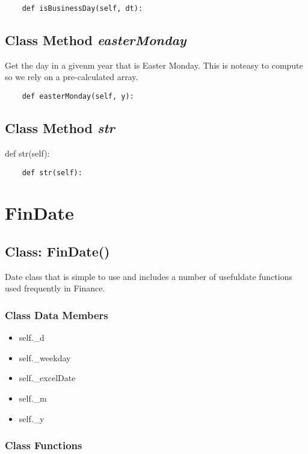 \documentclass[twoside,11pt]{book}
\begin{document}
\begin{lstlisting}
    def isBusinessDay(self, dt):
\end{lstlisting}

\subsection{Class Method {\it easterMonday}}
Get the day in a givenm year that is Easter Monday. This is noteasy to compute so we rely on a pre-calculated array. 

\begin{lstlisting}
    def easterMonday(self, y):
\end{lstlisting}

\subsection{Class Method {\it str}}
def str(self):

\begin{lstlisting}
    def str(self):
\end{lstlisting}

\newpage
\section{FinDate}

\subsection{Class: FinDate()}
Date class that is simple to use and includes a number of usefuldate functions used frequently in Finance. 

\subsubsection{Class Data Members}
\begin{itemize}
\item{self.\_d}
\item{self.\_weekday}
\item{self.\_excelDate}
\item{self.\_m}
\item{self.\_y}
\end{itemize}

\subsubsection{Class Functions}
\end{document}
